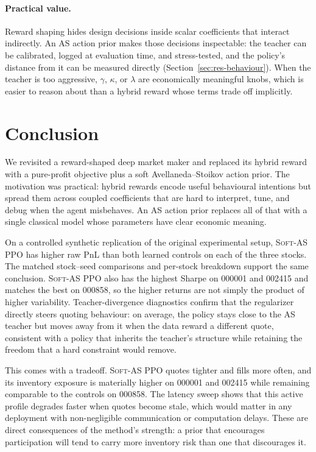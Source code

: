 \documentclass{article}
\newcommand{\softas}{\textsc{Soft-AS PPO}}
\begin{document}
\paragraph{Practical value.}
Reward shaping hides design decisions inside scalar coefficients that interact indirectly. An AS action prior makes those decisions inspectable: the teacher can be calibrated, logged at evaluation time, and stress-tested, and the policy's distance from it can be measured directly (Section~\ref{sec:res-behaviour}). When the teacher is too aggressive, $\gamma$, $\kappa$, or $\lambda$ are economically meaningful knobs, which is easier to reason about than a hybrid reward whose terms trade off implicitly.

\section{Conclusion}

We revisited a reward-shaped deep market maker and replaced its hybrid
reward with a pure-profit objective plus a soft Avellaneda--Stoikov
action prior. The motivation was practical: hybrid rewards encode useful behavioural intentions but spread them across coupled coefficients that are hard to interpret, tune, and
debug when the agent misbehaves. An AS action prior replaces all of that with a single classical model whose parameters have clear economic meaning.

On a controlled synthetic replication of the original experimental
setup, \softas{} has higher raw PnL than both learned controls on each of the three stocks. The matched stock--seed comparisons and per-stock breakdown support the same conclusion. \softas{} also has the highest Sharpe on 000001 and 002415 and matches the best on 000858, so the higher returns are not simply the product of higher variability.
Teacher-divergence diagnostics
confirm that the regularizer directly steers quoting behaviour: on average, the
policy stays close to the AS teacher but moves away from it when the data reward a different quote, consistent with a policy that inherits the teacher's structure while retaining the freedom that a hard constraint would remove.

This comes with a tradeoff. \softas{} quotes tighter and fills more
often, and its inventory exposure is materially higher on 000001 and
002415 while remaining comparable to the controls on 000858. The
latency sweep shows that this active profile degrades faster when
quotes become stale, which would matter in any deployment with
non-negligible communication or computation delays. These are direct consequences of the method's strength: a prior that encourages participation will tend to carry
more inventory risk than one that discourages it.
\end{document}
